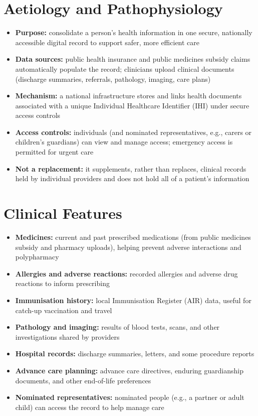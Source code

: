 \section*{Aetiology and Pathophysiology}
\begin{itemize}
    \item \textbf{Purpose:} consolidate a person's health information in one secure, nationally accessible digital record to support safer, more efficient care
    \item \textbf{Data sources:} public health insurance and public medicines subsidy claims automatically populate the record; clinicians upload clinical documents (discharge summaries, referrals, pathology, imaging, care plans)
    \item \textbf{Mechanism:} a national infrastructure stores and links health documents associated with a unique Individual Healthcare Identifier (IHI) under secure access controls
    \item \textbf{Access controls:} individuals (and nominated representatives, e.g., carers or children's guardians) can view and manage access; emergency access is permitted for urgent care
    \item \textbf{Not a replacement:} it supplements, rather than replaces, clinical records held by individual providers and does not hold all of a patient's information
\end{itemize}

\section*{Clinical Features}
\begin{itemize}
    \item \textbf{Medicines:} current and past prescribed medications (from public medicines subsidy and pharmacy uploads), helping prevent adverse interactions and polypharmacy
    \item \textbf{Allergies and adverse reactions:} recorded allergies and adverse drug reactions to inform prescribing
    \item \textbf{Immunisation history:} local Immunisation Register (AIR) data, useful for catch-up vaccination and travel
    \item \textbf{Pathology and imaging:} results of blood tests, scans, and other investigations shared by providers
    \item \textbf{Hospital records:} discharge summaries, letters, and some procedure reports
    \item \textbf{Advance care planning:} advance care directives, enduring guardianship documents, and other end-of-life preferences
    \item \textbf{Nominated representatives:} nominated people (e.g., a partner or adult child) can access the record to help manage care
\end{itemize}

